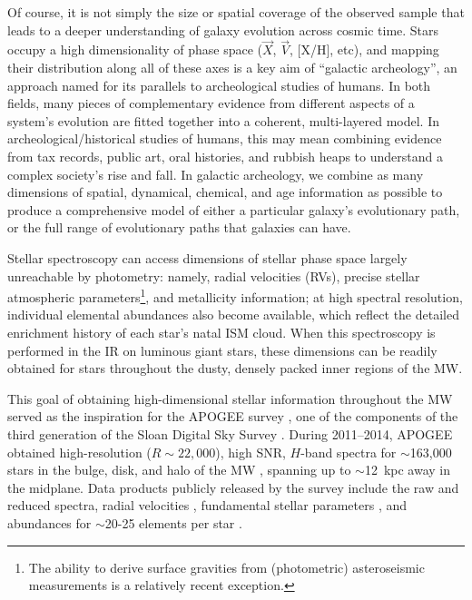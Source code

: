 \documentclass[12pt,twocolumn]{emulateapj}
\begin{document}
Of course, it is not simply the size or spatial coverage of the observed sample that leads to a deeper understanding of galaxy evolution across cosmic time.  Stars occupy a high dimensionality of phase space ($\vec{X}$, $\vec{V}$, [X/H], etc), and mapping their distribution along all of these axes is a key aim of ``galactic archeology'', an approach named for its parallels to archeological studies of humans.  In both fields, many pieces of complementary evidence from different aspects of a system's evolution are fitted together into a coherent, multi-layered model.  In archeological/historical studies of humans, this may mean combining evidence from tax records, public art, oral histories, and rubbish heaps to understand a complex society's rise and fall.  In galactic archeology, we combine as many dimensions of spatial, dynamical, chemical, and age information as possible to produce a comprehensive model of either a particular galaxy's evolutionary path, or the full range of evolutionary paths that galaxies can have.

Stellar spectroscopy can access dimensions of stellar phase space largely unreachable by photometry: namely, radial velocities (RVs), precise stellar atmospheric parameters\footnote{The ability to derive surface gravities from (photometric) asteroseismic measurements is a relatively recent exception.}, and metallicity information; at high spectral resolution, individual elemental abundances also become available, which reflect the detailed enrichment history of each star's natal ISM cloud.  When this spectroscopy is performed in the IR on luminous giant stars, these dimensions can be readily obtained for stars throughout the dusty, densely packed inner regions of the MW.  

This goal of obtaining high-dimensional stellar information throughout the MW served as the inspiration for the APOGEE survey \citep{Majewski_2017_apogeeoverview}, one of the components of the third generation of the Sloan Digital Sky Survey \citep[SDSS-III;][]{Eisenstein_11_sdss3overview}.  During 2011--2014, APOGEE obtained high-resolution ($R \sim 22,000$), high SNR, $H$-band spectra for $\sim$163,000 stars in the bulge, disk, and halo of the MW \citep{Zasowski_2013_apogeetargeting,Holtzman_2015_apogeedata}, spanning up to $\sim$12~kpc away in the midplane.  Data products publicly released by the survey \citep{Holtzman_2015_apogeedata} include the raw and reduced spectra, radial velocities \citep{Nidever_2015_apogeereduction}, fundamental stellar parameters \citep{GarciaPerez_2016_aspcap,Meszaros_2013_aspcapcalib,Zamora_2015_apogeelibraries}, and abundances for $\sim$20-25 elements per star \citep{Shetrone_2015_apogeelinelist,Smith_2013_apogeelinelistFTS}.
\end{document}
